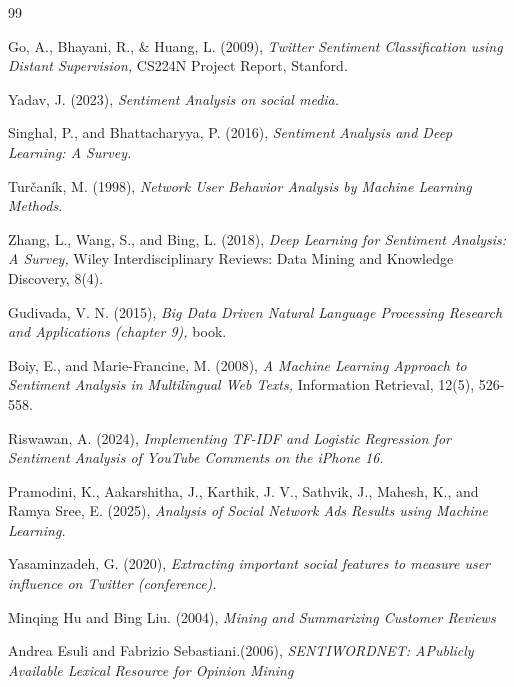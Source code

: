 \documentclass[twoside]{article}
\begin{document}
\begin{thebibliography}{99}
	
	Go, A., Bhayani, R., \& Huang, L. (2009), {\it Twitter Sentiment Classification using Distant Supervision,} CS224N Project Report, Stanford.
	
	Yadav, J. (2023), {\it Sentiment Analysis on social media.}
	
	Singhal, P., and Bhattacharyya, P. (2016), {\it Sentiment Analysis and Deep Learning: A Survey.}
	
	Turčaník, M. (1998), {\it Network User Behavior Analysis by Machine Learning Methods.}
	
	Zhang, L., Wang, S., and Bing, L. (2018), {\it Deep Learning for Sentiment Analysis: A Survey,} Wiley Interdisciplinary Reviews: Data Mining and Knowledge Discovery, 8(4).
	
	Gudivada, V. N. (2015), {\it Big Data Driven Natural Language Processing Research and Applications (chapter 9),} book.
	
	Boiy, E., and Marie-Francine, M. (2008), {\it A Machine Learning Approach to Sentiment Analysis in Multilingual Web Texts,} Information Retrieval, 12(5), 526-558.
	
	Riswawan, A. (2024), {\it Implementing TF-IDF and Logistic Regression for Sentiment Analysis of YouTube Comments on the iPhone 16.}
	
	Pramodini, K., Aakarshitha, J., Karthik, J. V., Sathvik, J., Mahesh, K., and Ramya Sree, E. (2025), {\it Analysis of Social Network Ads Results using Machine Learning.}
	
	Yasaminzadeh, G. (2020), {\it Extracting important social features to measure user influence on Twitter (conference).}
	
	Minqing Hu and Bing Liu. (2004), {\it Mining and Summarizing Customer Reviews}
	
	Andrea Esuli and Fabrizio Sebastiani.(2006), {\it SENTIWORDNET: APublicly Available Lexical Resource for Opinion Mining}
	
\end{thebibliography}
 
\end{document}
